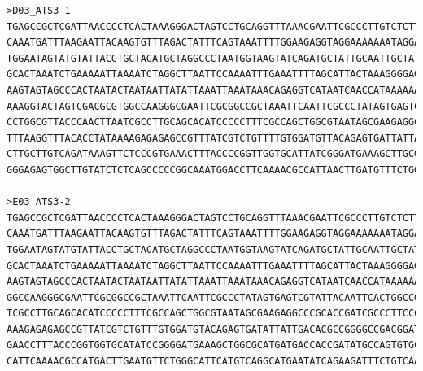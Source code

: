 \begin{verbatim}
>D03_ATS3-1
TGAGCCGCTCGATTAACCCCTCACTAAAGGGACTAGTCCTGCAGGTTTAAACGAATTCGCCCTTGTCTCTTTCTGTGTCTCAGCTTCCTCATCCTTAGGATGCCAGTATATTTCAGAATT
CAAATGATTTAAGAATTACAAGTGTTTAGACTATTTCAGTAAATTTTGGAAGAGGTAGGAAAAAAATAGGAGGTGAAGATGAGCAAAATGCATTGTATCATATATGAAATCCTCAATTAA
TGGAATAGTATGTATTACCTGCTACATGCTAGGCCCTAATGGTAAGTATCAGATGCTATTGCAATTGCTATAATTTCTATCATTTGCATGAGTATATGACTTGGTCAAGAGAACTCCATT
GCACTAAATCTGAAAAATTAAAATCTAGGCTTAATTCCAAAATTTGAAATTTTAGCATTACTAAAGGGGAGACAGCAGAGAAAATGTTTGAAACTGACCAGCTTTTTTGCACCAAGTTAC
AAGTAGTAGCCCACTAATACTAATAATTATATTAAATTAAATAAACAGAGGTCATAATCAACCATAAAAAAAAAAAAAAAAAAAAAAAGAAAAAAAAAAAAAAAAAAAAAAAAAAAAAAA
AAAGGTACTAGTCGACGCGTGGCCAAGGGCGAATTCGCGGCCGCTAAATTCAATTCGCCCTATAGTGAGTCGTATTACAATTCACTGGCCGTCGTTTTACAACGTCGTGACTGGGAAAAC
CCTGGCGTTACCCAACTTAATCGCCTTGCAGCACATCCCCCTTTCGCCAGCTGGCGTAATAGCGAAGAGGCCCGCACCGATCGCCCTTCCCAACAGTTGCGCAGCCTATACGTACGGCAG
TTTAAGGTTTACACCTATAAAAGAGAGAGCCGTTTATCGTCTGTTTTGTGGATGTTACAGAGTGATTATTATTGACACGCCGGGGGCGACGATGGTGATCCCCCTTGACCAGTGCACGTT
CTTGCTTGTCAGATAAAGTTCTCCCGTGAAACTTTACCCCGGTTGGTGCATTATCGGGATGAAAGCTTGCGCATGATTGACCACCCGATTATGACCAGTTGTGCCGTTCTTCGGTTATTC
GGGAGAGTGGCTTGTATCTCTCAGCCCCCGGCAAATGGACCTTCAAAACGCCATTAACTTGATGTTTCTGGGGAAATTATAATTGTGTCTC

>E03_ATS3-2
TGAGCCGCTCGATTAACCCCTCACTAAAGGGACTAGTCCTGCAGGTTTAAACGAATTCGCCCTTGTCTCTTTCTGTGTCTCAGCTTCCTCATCCTTAGGATGCCAGTATATTTCAGAATT
CAAATGATTTAAGAATTACAAGTGTTTAGACTATTTCAGTAAATTTTGGAAGAGGTAGGAAAAAAATAGGAGGTGAAGATGAGCAAAATGCATTGTATCATATATGAAATCCTCAATTAA
TGGAATAGTATGTATTACCTGCTACATGCTAGGCCCTAATGGTAAGTATCAGATGCTATTGCAATTGCTATAATTTCTATCATTTGCATGAGTATATGACTTGGTCAAGAGAACTCCATT
GCACTAAATCTGAAAAATTAAAATCTAGGCTTAATTCCAAAATTTGAAATTTTAGCATTACTAAAGGGGAGACAGCAGAGAAAATGTTTGAAACTGACCAGCTTTTTTGCACCAAGTTAC
AAGTAGTAGCCCACTAATACTAATAATTATATTAAATTAAATAAACAGAGGTCATAATCAACCATAAAAAAAAAAAAAAAAAAAAAAAAAAAAAAAAAAAAAAGGTACTAGTCGACGCGT
GGCCAAGGGCGAATTCGCGGCCGCTAAATTCAATTCGCCCTATAGTGAGTCGTATTACAATTCACTGGCCGTCGTTTTACAACGTCGTGACTGGGAAAACCCTGGCGTTACCCAACTTAA
TCGCCTTGCAGCACATCCCCCTTTCGCCAGCTGGCGTAATAGCGAAGAGGCCCGCACCGATCGCCCTTCCCAACAGTTGCGCAGCCTATACGTACGGCAGTTTAAGGGTTTACACCTATA
AAAGAGAGAGCCGTTATCGTCTGTTTGTGGATGTACAGAGTGATATTATTGACACGCCGGGGCCGACGGATGGTGATCCCCCTGGCCAGTGCACGTCTGCTGTCAGATAAAGTCTCCCGT
GAACCTTTACCCGGTGGTGCATATCCGGGGATGAAAGCTGGCGCATGATGACCACCGATATGCCAGTGTGCCAGTCTCGTTATCGGGCAGAGTGGCCTGATCTCAGCACCGCGTAATTGA
CATTCAAAACGCCATGACTTGAATGTTCTGGGCATTCATGTCAGGCATGAATATCAGAAGATTTCTGTCAAACT


\end{verbatim}

